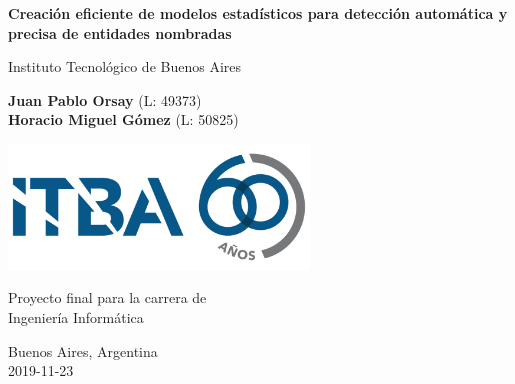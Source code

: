 \begin{titlepage}
    \begin{center}
        \vspace*{1cm}

        \Huge
        \textbf{Creación eficiente de modelos estadísticos para detección automática y precisa de entidades nombradas}

        \vspace{0.5cm}
        \LARGE
        Instituto Tecnológico de Buenos Aires

        \vspace{1.5cm}

        \textbf{Juan Pablo Orsay} (L: 49373)\\
        \textbf{Horacio Miguel Gómez} (L: 50825)

        \vfill

        \includegraphics[width=0.6\textwidth]{assets/logoItba}

        \vspace{0.8cm}

        Proyecto final para la carrera de\\
        Ingeniería Informática

        \vspace{0.8cm}

        \Large
        Buenos Aires, Argentina\\
        2019-11-23

    \end{center}
\end{titlepage}

\let\maketitle\oldmaketitle
